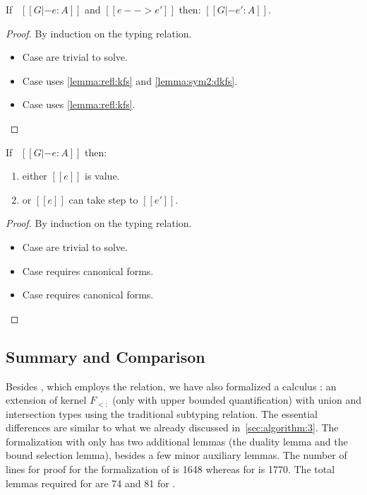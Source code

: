 \begin{lemma}
 If \ $[[G |- e : A ]]$ and $[[e --> e' ]]$ then: $[[G |- e' : A ]]$.
\end{lemma}

\begin{proof}
 By induction on the typing relation.
\begin{itemize}
  \item{Case  are trivial to solve.}
  \item{Case  uses \cref{lemma:refl:kfs} and \cref{lemma:sym2:dkfs}.}
  \item{Case  uses \cref{lemma:refl:kfs}.}
\end{itemize}
\end{proof}

\begin{lemma}[Progress]
 If \ $[[G |- e : A ]]$ then:
 \begin{enumerate}
  \item either $[[e]]$ is value.
  \item or $[[e]]$ can take step to $[[e']]$.
  \end{enumerate}
\end{lemma}

\begin{proof}
  By induction on the typing relation.
  \begin{itemize}
      \item{Case  are trivial to solve.}
      \item{Case  requires canonical forms.}
      \item{Case  requires canonical forms.}
  \end{itemize}
\end{proof}


\subsection{Summary and Comparison}
\label{sec:system-dfsub:3}
Besides \gfskiu , which employs the \nameduo relation, we have also formalized
a calculus \fskiu: an extension of kernel $F_{<:}$ (only with
upper bounded quantification) with union and intersection types using the traditional
subtyping relation. The essential differences are similar to 
what we already discussed in~\cref{sec:algorithm:3}. The formalization
with \nameduo only has two additional lemmas (the duality lemma and the bound selection lemma), besides a few
minor auxiliary lemmas. 
The number of lines for proof for the formalization of \fskiu is 1648 whereas for \gfskiu is 1770.
The total lemmas required for \fskiu are 74 and 81 for
\gfskiu. 

